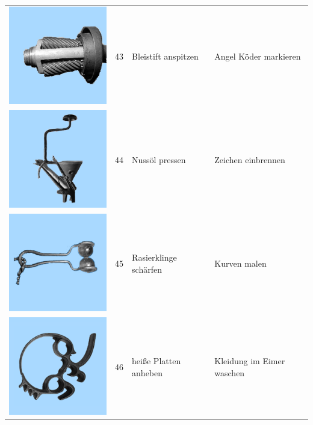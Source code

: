 \documentclass[
  english,
  man,floatsintext]{apa7}
\begin{document}
\begin{center}
\begin{ThreePartTable}
\begin{longtable}{llll}
\includegraphics[valign=c, scale=0.19]{../materials/unfamiliar/43.png} & 43 & Bleistift anspitzen & Angel Köder markieren\\
\includegraphics[valign=c, scale=0.19]{../materials/unfamiliar/44.png} & 44 & Nussöl pressen & Zeichen einbrennen\\
\includegraphics[valign=c, scale=0.19]{../materials/unfamiliar/45.png} & 45 & Rasierklinge schärfen & Kurven malen\\
\includegraphics[valign=c, scale=0.19]{../materials/unfamiliar/46.png} & 46 & heiße Platten anheben & Kleidung im Eimer waschen\\

\end{longtable}
\end{ThreePartTable}
\end{center}
\end{document}
